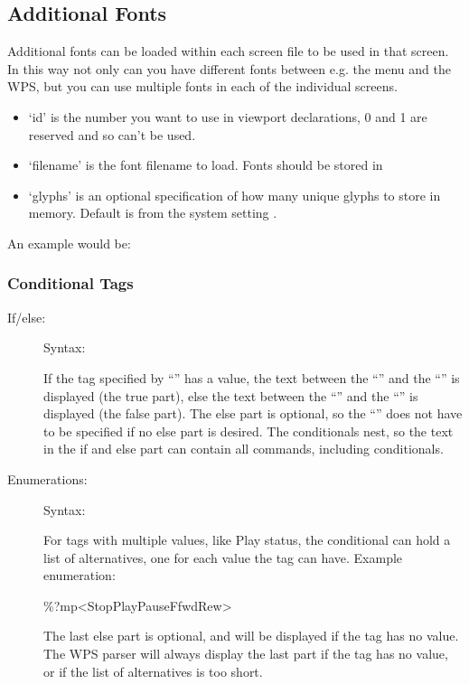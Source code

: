 \subsection{\label{ref:multifont}Additional Fonts}
Additional fonts can be loaded within each screen file to be used in that
screen. In this way not only can you have different fonts between e.g. the menu
and the WPS, but you can use multiple fonts in each of the individual screens.\\


  \begin{itemize}
    \item `id' is the number you want to use in viewport declarations, 0 and 1
       are reserved and so can't be used.
    \item `filename' is the font filename to load. Fonts should be stored in
    \item `glyphs' is an optional specification of how many unique glyphs to
       store in memory. Default is from the system setting
       .
  \end{itemize}

  An example would be: 

\subsubsection{Conditional Tags}

\begin{description}
\item[If/else: ]
Syntax: 

If the tag specified by ``'' has a value, the text between the
``\config{{\textless}}'' and the ``\config{{\textbar}}'' is displayed (the true
part), else the text between the ``\config{{\textbar}}'' and the
``\config{{\textgreater}}'' is displayed (the false part).
The else part is optional, so the ``\config{{\textbar}}'' does not have to be
specified if no else part is desired. The conditionals nest, so the text in the
if and else part can contain all \config{\%} commands, including conditionals.

\item[Enumerations: ]
Syntax: 

For tags with multiple values, like Play status, the conditional can hold a
list of alternatives, one for each value the tag can have.
Example enumeration:
\begin{example}
     \%?mp{\textless}Stop{\textbar}Play{\textbar}Pause{\textbar}Ffwd{\textbar}Rew{\textgreater}
\end{example}

The last else part is optional, and will be displayed if the tag has no value.
The WPS parser will always display the last part if the tag has no value, or if
the list of alternatives is too short.
\end{description}


